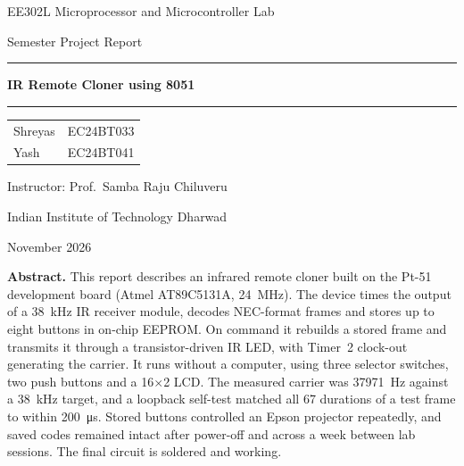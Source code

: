 \documentclass[11pt,a4paper]{article}
\begin{document}
\begin{titlepage}
\centering
\vspace*{3.2cm}
{\large\sffamily EE302L Microprocessor and Microcontroller Lab\par}
\vspace{0.3cm}
{\large\sffamily Semester Project Report\par}
\vspace{1.4cm}
{\color{accent}\rule{\textwidth}{0.8pt}\par}
\vspace{0.5cm}
{\Huge\sffamily\bfseries\color{accent} IR Remote Cloner using 8051\par}
\vspace{0.5cm}
{\color{accent}\rule{\textwidth}{0.8pt}\par}
\vspace{1.6cm}
{\large
\begin{tabular}{ll}
Shreyas & EC24BT033\\
Yash & EC24BT041\\
\end{tabular}\par}
\vspace{1.2cm}
{\large Instructor: Prof.\ Samba Raju Chiluveru\par}
\vspace{0.3cm}
{\large Indian Institute of Technology Dharwad\par}
\vspace{0.3cm}
{\large November 2026\par}
\vfill
\begin{minipage}{0.88\textwidth}
\small
\textbf{Abstract.} This report describes an infrared remote cloner built on the Pt-51 development board (Atmel AT89C5131A, \qty{24}{\mega\hertz}). The device times the output of a \qty{38}{\kilo\hertz} IR receiver module, decodes NEC-format frames and stores up to eight buttons in on-chip EEPROM. On command it rebuilds a stored frame and transmits it through a transistor-driven IR LED, with Timer~2 clock-out generating the carrier. It runs without a computer, using three selector switches, two push buttons and a 16$\times$2 LCD. The measured carrier was \qty{37971}{\hertz} against a \qty{38}{\kilo\hertz} target, and a loopback self-test matched all 67 durations of a test frame to within \qty{200}{\micro\second}. Stored buttons controlled an Epson projector repeatedly, and saved codes remained intact after power-off and across a week between lab sessions. The final circuit is soldered and working.
\end{minipage}
\vspace{0.6cm}
\end{titlepage}
\end{document}

